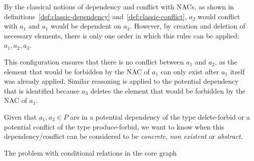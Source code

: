 By the classical notions of dependency and conflict with NACs, as shown in definitions~\ref{def:classic-dependency} and~\ref{def:classic-conflict}, $a_2$ would conflict with $a_1$ and $a_1$ would be dependent on $a_3$. However, by creation and deletion of necessary elements, there is only one order in which this rules can be applied: $a_1,a_2,a_3$.

This configuration ensures that there is no conflict between $a_1$ and $a_2$, as the element that would be forbidden by the NAC of $a_1$ can only exist after $a_1$ itself was already applied. Similar reasoning is applied to the potential dependency that is identified because $a_3$ deletes the element that would be forbidden by the NAC of $a_1$.

Given that $a_1, a_2 \in P$ are in a potential dependency of the type delete-forbid or a potential conflict of the type produce-forbid, we want to know when this dependency/conflict can be considered to be \emph{concrete}, \emph{non existent} or \emph{abstract}.

The problem with conditional relations in the core graph

